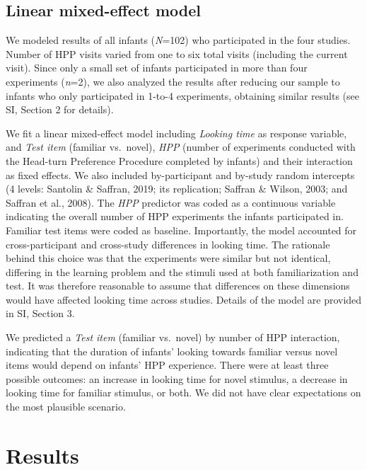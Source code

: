\documentclass[english,man]{apa6}
\begin{document}
\hypertarget{linear-mixed-effect-model}{%
\subsection{Linear mixed-effect model}\label{linear-mixed-effect-model}}

We modeled results of all infants (\emph{N}=102) who participated in the four studies. Number of HPP visits varied from one to six total visits (including the current visit). Since only a small set of infants participated in more than four experiments (\emph{n}=2), we also analyzed the results after reducing our sample to infants who only participated in 1-to-4 experiments, obtaining similar results (see SI, Section 2 for details).

We fit a linear mixed-effect model including \emph{Looking time} as response variable, and \emph{Test item} (familiar vs.~novel), \emph{HPP} (number of experiments conducted with the Head-turn Preference Procedure completed by infants) and their interaction as fixed effects. We also included by-participant and by-study random intercepts (4 levels: Santolin \& Saffran, 2019; its replication; Saffran \& Wilson, 2003; and Saffran et al., 2008). The \emph{HPP} predictor was coded as a continuous variable indicating the overall number of HPP experiments the infants participated in. Familiar test items were coded as baseline. Importantly, the model accounted for cross-participant and cross-study differences in looking time. The rationale behind this choice was that the experiments were similar but not identical, differing in the learning problem and the stimuli used at both familiarization and test. It was therefore reasonable to assume that differences on these dimensions would have affected looking time across studies. Details of the model are provided in SI, Section 3.

We predicted a \emph{Test item} (familiar vs.~novel) by number of HPP interaction, indicating that the duration of infants' looking towards familiar versus novel items would depend on infants' HPP experience. There were at least three possible outcomes: an increase in looking time for novel stimulus, a decrease in looking time for familiar stimulus, or both. We did not have clear expectations on the most plausible scenario.

\hypertarget{results}{%
\section{Results}\label{results}}
\end{document}
